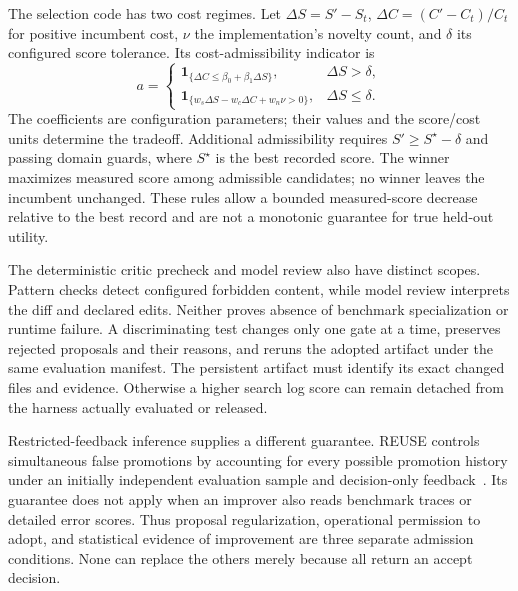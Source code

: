 The selection code has two cost regimes. Let $\Delta S=S'-S_t$, $\Delta C=(C'-C_t)/C_t$ for positive incumbent cost, $\nu$ the implementation's novelty count, and $\delta$ its configured score tolerance. Its cost-admissibility indicator is
\begin{equation}
 a=\begin{cases}
 \mathbf1_{\{\Delta C\leq\beta_0+\beta_1\Delta S\}},
 &\Delta S>\delta,\\
 \mathbf1_{\{w_s\Delta S-w_c\Delta C+w_n\nu>0\}},
 &\Delta S\leq\delta.
 \end{cases}
\end{equation}
The coefficients are configuration parameters; their values and the score/cost units determine the tradeoff. Additional admissibility requires $S'\geq S^\star-\delta$ and passing domain guards, where $S^\star$ is the best recorded score. The winner maximizes measured score among admissible candidates; no winner leaves the incumbent unchanged. These rules allow a bounded measured-score decrease relative to the best record and are not a monotonic guarantee for true held-out utility.

The deterministic critic precheck and model review also have distinct scopes. Pattern checks detect configured forbidden content, while model review interprets the diff and declared edits. Neither proves absence of benchmark specialization or runtime failure. A discriminating test changes only one gate at a time, preserves rejected proposals and their reasons, and reruns the adopted artifact under the same evaluation manifest. The persistent artifact must identify its exact changed files and evidence. Otherwise a higher search log score can remain detached from the harness actually evaluated or released.

Restricted-feedback inference supplies a different guarantee. REUSE controls simultaneous false promotions by accounting for every possible promotion history under an initially independent evaluation sample and decision-only feedback~\cite{ch02_reuse2026}. Its guarantee does not apply when an improver also reads benchmark traces or detailed error scores. Thus proposal regularization, operational permission to adopt, and statistical evidence of improvement are three separate admission conditions. None can replace the others merely because all return an accept decision.

